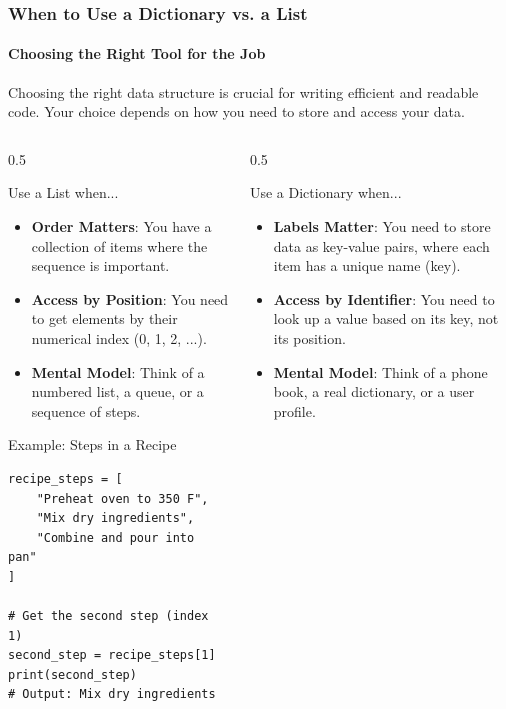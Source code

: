 \documentclass{beamer}
\begin{document}
\begin{frame}[fragile]
\frametitle{When to Use a Dictionary vs. a List}
\framesubtitle{Choosing the Right Tool for the Job}

Choosing the right data structure is crucial for writing efficient and readable code. Your choice depends on how you need to store and access your data.

\vspace{0.5em}

\begin{columns}[T] %

\begin{column}{0.5\textwidth}
    \begin{block}{Use a List when...}
    \begin{itemize}
        \item \textbf{Order Matters}: You have a collection of items where the sequence is important.
        \item \textbf{Access by Position}: You need to get elements by their numerical index (0, 1, 2, ...).
        \item \textbf{Mental Model}: Think of a numbered list, a queue, or a sequence of steps.
    \end{itemize}
    \end{block}
    
    \begin{block}{Example: Steps in a Recipe}
\begin{verbatim}
recipe_steps = [
    "Preheat oven to 350 F",
    "Mix dry ingredients",
    "Combine and pour into pan"
]

# Get the second step (index 1)
second_step = recipe_steps[1]
print(second_step)
# Output: Mix dry ingredients
\end{verbatim}
    \end{block}
\end{column}

\begin{column}{0.5\textwidth}
    \begin{block}{Use a Dictionary when...}
    \begin{itemize}
        \item \textbf{Labels Matter}: You need to store data as key-value pairs, where each item has a unique name (key).
        \item \textbf{Access by Identifier}: You need to look up a value based on its key, not its position.
        \item \textbf{Mental Model}: Think of a phone book, a real dictionary, or a user profile.
    \end{itemize}
    \end{block}
    

\end{column}
\end{columns}
\end{frame}
\end{document}
